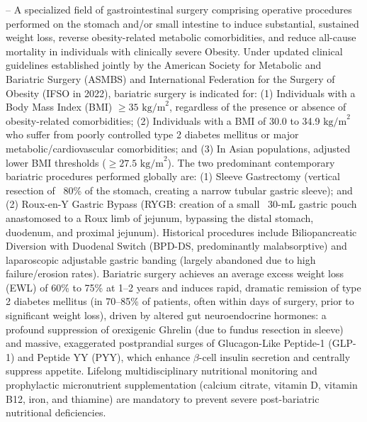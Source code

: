 -- A specialized field of gastrointestinal surgery comprising operative procedures performed on the stomach and/or small intestine to induce substantial, sustained weight loss, reverse obesity-related metabolic comorbidities, and reduce all-cause mortality in individuals with clinically severe Obesity. Under updated clinical guidelines established jointly by the American Society for Metabolic and Bariatric Surgery (ASMBS) and International Federation for the Surgery of Obesity (IFSO in 2022), bariatric surgery is indicated for: (1) Individuals with a Body Mass Index (BMI) $\ge 35\text{ kg/m}^2$, regardless of the presence or absence of obesity-related comorbidities; (2) Individuals with a BMI of 30.0 to 34.9 $\text{kg/m}^2$ who suffer from poorly controlled type 2 diabetes mellitus or major metabolic/cardiovascular comorbidities; and (3) In Asian populations, adjusted lower BMI thresholds ($\ge 27.5\text{ kg/m}^2$). The two predominant contemporary bariatric procedures performed globally are: (1) Sleeve Gastrectomy (vertical resection of ~80\% of the stomach, creating a narrow tubular gastric sleeve); and (2) Roux-en-Y Gastric Bypass (RYGB: creation of a small ~30-mL gastric pouch anastomosed to a Roux limb of jejunum, bypassing the distal stomach, duodenum, and proximal jejunum). Historical procedures include Biliopancreatic Diversion with Duodenal Switch (BPD-DS, predominantly malabsorptive) and laparoscopic adjustable gastric banding (largely abandoned due to high failure/erosion rates). Bariatric surgery achieves an average excess weight loss (EWL) of 60\% to 75\% at 1--2 years and induces rapid, dramatic remission of type 2 diabetes mellitus (in 70--85\% of patients, often within days of surgery, prior to significant weight loss), driven by altered gut neuroendocrine hormones: a profound suppression of orexigenic Ghrelin (due to fundus resection in sleeve) and massive, exaggerated postprandial surges of Glucagon-Like Peptide-1 (GLP-1) and Peptide YY (PYY), which enhance $\beta$-cell insulin secretion and centrally suppress appetite. Lifelong multidisciplinary nutritional monitoring and prophylactic micronutrient supplementation (calcium citrate, vitamin D, vitamin B12, iron, and thiamine) are mandatory to prevent severe post-bariatric nutritional deficiencies.

